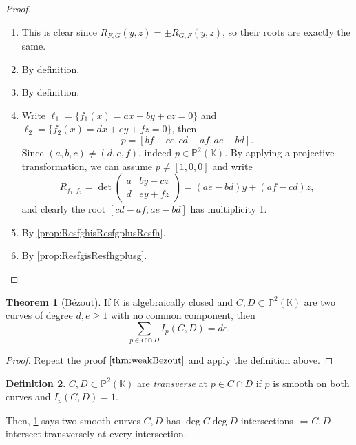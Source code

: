 \documentclass{article}
\newcommand{\K}{\mathbb{K}}
\newcommand{\p}{\mathbb{P}}
\theoremstyle{definition}
\newtheorem{defn}{Definition}[subsection]
\newtheorem{thm}[defn]{Theorem}
\begin{document}
\begin{proof}
\begin{enumerate}
\item This is clear since $R_{F,G}(y,z)=\pm R_{G,F}(y,z)$, so their roots are exactly the same.
\item By definition.
\item By definition.
\item Write $\ell_1=\{f_1(x)=ax+by+cz=0\}$ and $\ell_2=\{f_2(x)=dx+ey+fz=0\}$, then
\[
p=[bf-ce,cd-af,ae-bd].
\]
Since $(a,b,c)\neq (d,e,f)$, indeed $p\in\p^2(\K)$. By applying a projective transformation, we can assume $p\neq [1,0,0]$ and write
\[
R_{f_1,f_2}=\det\begin{pmatrix}
a & by+cz \\ d & ey+fz
\end{pmatrix}=(ae-bd)y+(af-cd)z,
\]
and clearly the root $[cd-af,ae-bd]$ has multiplicity 1. 
\item By \ref{prop:ResfghisResfgplusResfh}.
\item By \ref{prop:ResfgisResfhgplusg}.
\end{enumerate}
\end{proof}

\begin{thm}[Bézout]
\label{thm:strongBezout}
If $\K$ is algebraically closed and $C,D\subset\p^2(\K)$ are two curves of degree $d,e\geq 1$ with no common component, then
\[
\sum_{p\in C\cap D}I_p(C,D)=de.
\]
\end{thm}
\begin{proof}
Repeat the proof $\ref{thm:weakBezout}$ and apply the definition above.
\end{proof}

\begin{defn}
$C,D\subset\p^2(\K)$ are \textit{transverse} at $p\in C\cap D$ if $p$ is smooth on both curves and $I_p(C,D)=1$.
\end{defn}
Then, \ref{thm:strongBezout} says two smooth curves $C,D$ has $\deg C\deg D$ intersections $\iff C,D$ intersect transversely at every intersection.
\end{document}
